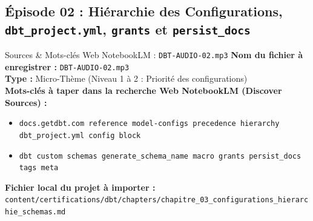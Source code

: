 \documentclass[11pt,a4paper]{article}
\begin{document}
\subsection{Épisode 02 : Hiérarchie des Configurations, \texttt{dbt\_project.yml}, \texttt{grants} et \texttt{persist\_docs}}
\begin{sourcebox}{Sources \& Mots-clés Web NotebookLM : \texttt{DBT-AUDIO-02.mp3}}
\textbf{Nom du fichier à enregistrer :} \texttt{DBT-AUDIO-02.mp3}\\
\textbf{Type :} Micro-Thème (Niveau 1 à 2 : Priorité des configurations)\\
\textbf{Mots-clés à taper dans la recherche Web NotebookLM (Discover Sources) :}
\begin{itemize}[noitemsep]
    \item \texttt{docs.getdbt.com reference model-configs precedence hierarchy dbt_project.yml config block}
    \item \texttt{dbt custom schemas generate_schema_name macro grants persist_docs tags meta}
\end{itemize}
\textbf{Fichier local du projet à importer :}
\texttt{content/certifications/dbt/chapters/chapitre_03_configurations_hierarchie_schemas.md}
\end{sourcebox}
\end{document}
